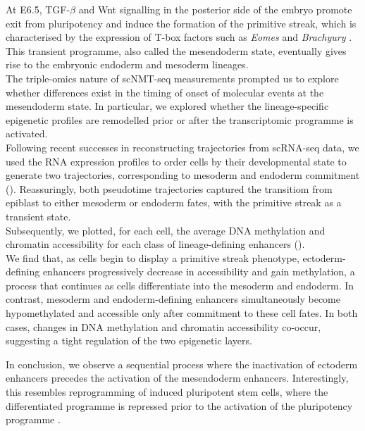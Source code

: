 At E6.5, TGF-$\beta$ and Wnt signalling in the posterior side of the embryo promote exit from pluripotency and induce the formation of the primitive streak, which is characterised by the expression of T-box factors such as \textit{Eomes} and \textit{Brachyury} \cite{Tosci2019}. This transient programme, also called the mesendoderm state, eventually gives rise to the embryonic endoderm and mesoderm lineages. \\
The triple-omics nature of scNMT-seq measurements prompted us to explore whether differences exist in the timing of onset of molecular events at the mesendoderm state. In particular, we explored whether the lineage-specific epigenetic profiles are remodelled prior or after the transcriptomic programme is activated.\\
Following recent successes in reconstructing trajectories from scRNA-seq data, we used the RNA expression profiles to order cells by their developmental state to generate two trajectories, corresponding to mesoderm and endoderm commitment (). Reassuringly, both pseudotime trajectories captured the transitiom from epiblast to either mesoderm or endoderm fates, with the primitive streak as a transient state.\\
 Subsequently, we plotted, for each cell, the average DNA methylation and chromatin accessibility for each class of lineage-defining enhancers ().\\
We find that, as cells begin to display a primitive streak phenotype, ectoderm-defining enhancers progressively decrease in accessibility and gain methylation, a process that continues as cells differentiate into the mesoderm and endoderm. In contrast, mesoderm and endoderm-defining enhancers simultaneously become hypomethylated and accessible only after commitment to these cell fates. In both cases, changes in DNA methylation and chromatin accessibility co-occur, suggesting a tight regulation of the two epigenetic layers.

In conclusion, we observe a sequential process where the inactivation of ectoderm enhancers precedes the activation of the mesendoderm enhancers. Interestingly, this resembles reprogramming of induced pluripotent stem cells, where the differentiated programme is repressed prior to the activation of the pluripotency programme \cite{Papp2013}.

